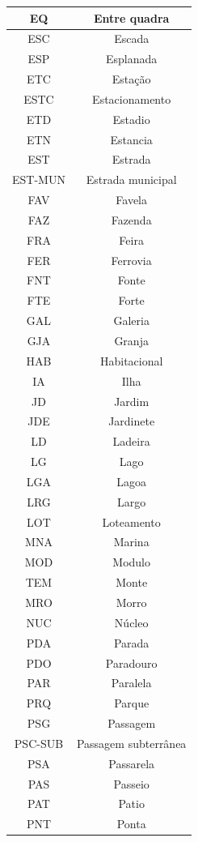 \documentclass[
	12pt,				%
	oneside,			%
	a4paper,			%
	english,			%
	brazil				%
	]{abntex2ppgsi}
\begin{document}
{{\begin{apendicesenv}
\begin{longtable}{c|c}
EQ & Entre quadra \\
\hline
ESC & Escada \\
\hline
ESP & Esplanada \\
\hline
ETC & Estação \\
\hline
ESTC & Estacionamento \\
\hline
ETD & Estadio \\
\hline
ETN & Estancia \\
\hline
EST & Estrada \\
\hline
EST-MUN & Estrada municipal \\
\hline
FAV & Favela \\
\hline
FAZ & Fazenda \\
\hline
FRA & Feira \\
\hline
FER & Ferrovia \\
\hline
FNT & Fonte \\
\hline
FTE & Forte \\
\hline
GAL & Galeria \\
\hline
GJA & Granja \\
\hline
HAB & Habitacional \\
\hline
IA & Ilha \\
\hline
JD & Jardim \\
\hline
JDE & Jardinete \\
\hline
LD & Ladeira \\
\hline
LG & Lago \\
\hline
LGA & Lagoa \\
\hline
LRG & Largo \\
\hline
LOT & Loteamento \\
\hline
MNA & Marina \\
\hline
MOD & Modulo \\
\hline
TEM & Monte \\
\hline
MRO & Morro \\
\hline
NUC & Núcleo \\
\hline
PDA & Parada \\
\hline
PDO & Paradouro \\
\hline
PAR & Paralela \\
\hline
PRQ & Parque \\
\hline
PSG & Passagem \\
\hline
PSC-SUB & Passagem subterrânea \\
\hline
PSA & Passarela \\
\hline
PAS & Passeio \\
\hline
PAT & Patio \\
\hline
PNT & Ponta \\

\end{longtable}
\end{apendicesenv}}}
\end{document}

